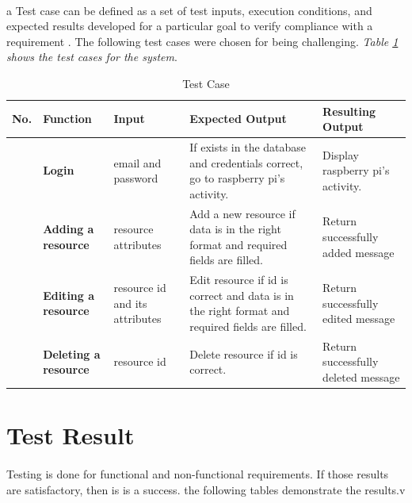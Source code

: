 \documentclass[12pt, oneside, a4paper]{book}
\newcounter{magicrownumbers}
\newcommand\rownumber{\stepcounter{magicrownumbers}\arabic{magicrownumbers}}
\newcommand\boldcolor[1]{\textcolor{bold}{\textbf{#1}}}
\begin{document}
		\paragraph{}a Test case can be defined as a set of test inputs, execution conditions, and expected results developed for a particular goal to verify compliance with a requirement \cite{test_case}. The following test cases were chosen for being challenging. \textit{Table \ref{table:test_case} shows the test cases for the system}.
		\setcounter{magicrownumbers}{0} 
		\def\arraystretch{1.5}
		\begin{table}[H]
			\begin{center}
				\begin{tabularx}{\linewidth}{|c|X|X|X|X|}\hline
					\boldcolor{No.} & \boldcolor{Function} & \boldcolor{Input} & \boldcolor{Expected Output} & \boldcolor{Resulting Output}\\\hline
					\rownumber & \textbf{Login} & email and password & If exists in the database and credentials correct, go to raspberry pi's activity. & Display raspberry pi's activity. \\\hline
					\rownumber & \textbf{Adding a resource} & resource attributes  & Add a new resource if data is in the right format and required fields are filled. & Return successfully added message \\\hline
					\rownumber & \textbf{Editing a resource} & resource id and its attributes  & Edit resource if id is correct and data is in the right format and required fields are filled. & Return successfully edited message \\\hline
					\rownumber & \textbf{Deleting a resource} & resource id & Delete resource if id is correct. & Return successfully deleted message \\\hline
				\end{tabularx}
			\end{center}
			\caption{Test Case}
			\label{table:test_case}
		\end{table}
		\section{Test Result}
		\paragraph{}Testing is done for functional and non-functional requirements. If those results are satisfactory, then is is a success. the following tables demonstrate the results.v 
\end{document}

